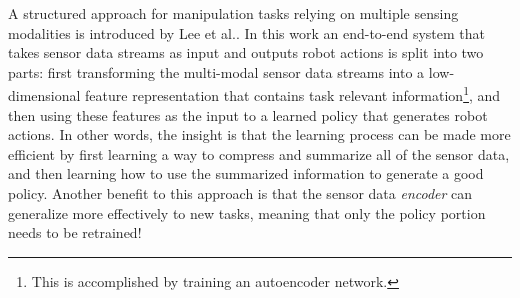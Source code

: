 A structured approach for manipulation tasks relying on multiple sensing modalities is introduced by Lee et al.\cite{LeeZhuEtAl2019}. In this work an end-to-end system that takes sensor data streams as input and outputs robot actions is split into two parts: first transforming the multi-modal sensor data streams into a low-dimensional feature representation that contains task relevant information\footnote{This is accomplished by training an autoencoder network.}, and then using these features as the input to a learned policy that generates robot actions. In other words, the insight is that the learning process can be made more efficient by first learning a way to compress and summarize all of the sensor data, and then learning how to use the summarized information to generate a good policy. Another benefit to this approach is that the sensor data \textit{encoder} can generalize more effectively to new tasks, meaning that only the policy portion needs to be retrained!
